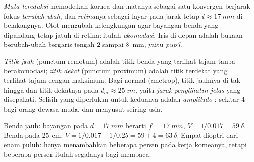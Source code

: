 \begin{definition}\label{def:b1:optical-instruments:eye}
\emph{Mata tereduksi} memodelkan kornea dan  matanya sebagai satu
 konvergen berjarak fokus \emph{berubah-ubah}, dan
\emph{retina}nya sebagai layar pada jarak tetap $d \approx \qty{17}{mm}$
di belakangnya. Otot mengubah kelengkungan  agar bayangan benda
yang dipandang tetap jatuh di retina: itulah \emph{akomodasi}. Iris di
depan  adalah bukaan berubah-ubah bergaris tengah \qty{2}{}
sampai \qty{8}{mm}, yaitu \emph{pupil}.
\end{definition}

\begin{definition}\label{def:b1:optical-instruments:punctum}
\emph{Titik jauh} (punctum remotum) adalah titik benda yang terlihat
tajam tanpa berakomodasi; \emph{titik dekat} (punctum proximum) adalah
titik terdekat yang terlihat tajam dengan  maksimum. Bagi 
normal (emetrop), titik jauhnya di tak hingga dan titik dekatnya pada
$d_m \approx \qty{25}{cm}$, yaitu \emph{jarak penglihatan jelas} yang
disepakati. Selisih  yang diperlukan untuk keduanya adalah
\emph{amplitudo }: sekitar \qty{4}{\delta} bagi orang dewasa
muda, dan menyusut seiring usia.
\end{definition}

\begin{example}\label{ex:b1:optical-instruments:vergence}
Benda jauh: bayangan pada $d = \qty{17}{mm}$ berarti $f' = \qty{17}{mm}$,
$V = 1/0.017 = \qty{59}{\delta}$. Benda pada \qty{25}{cm}:
$V = 1/0.017 + 1/0.25 = 59 + 4 = \qty{63}{\delta}$. Empat dioptri
 dari enam puluh:   hanya menambahkan beberapa
persen pada kerja korneanya, tetapi beberapa persen itulah segalanya
bagi membaca.
\end{example}

